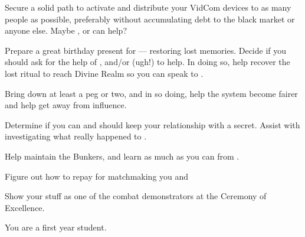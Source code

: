 \documentclass[char]{GL2020}
\begin{document}
\begin{itemz}
    \item Secure a solid path to activate and distribute your VidCom devices to as many people as possible, preferably without accumulating debt to the black market or anyone else. Maybe \cAssistantScientist{}, or \cChupInventor{} can help?
    \item Prepare a great birthday present for \cDisney{} — restoring \cDisney{\their} lost memories. Decide if you should ask for the help of \cWildCard{}, and/or \cPirateChild{} (ugh!) to help. In doing so, help \cDisney{} recover the lost ritual to reach Divine Realm so you can speak to \cTechGod{}.
    \item Bring down \cAntiChup{} at least a peg or two, and in so doing, help the system become fairer and help \cScholarship{} get away from \cAntiChup{\their} influence.  
    \item Determine if you can and should keep your relationship with \cWarlordDaughter{} a secret. Assist \cWarlordDaughter{\them} with investigating what really happened to \cLoud{}.
\end{itemz}

\begin{itemz}
    \item Help \cBunker{} maintain the Bunkers, and learn as much as you can from \cBunker{\them}.
    \item Figure out how to repay \cInitiate{} for matchmaking you and \cWarlordDaughter{}
    \item Show your stuff as one of the combat demonstrators at the Ceremony of Excellence.
\end{itemz}

\begin{itemz}[Notes]
    \item You are a first year student.
\end{itemz}
\end{document}
